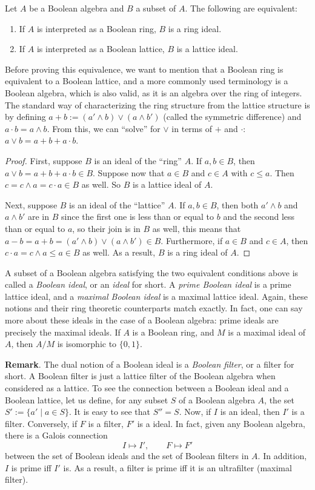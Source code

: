 \documentclass[12pt]{article}
\begin{document}
Let $A$ be a Boolean algebra and $B$ a subset of $A$.  The following are equivalent:
\begin{enumerate}
\item If $A$ is interpreted as a Boolean ring, $B$ is a ring ideal.
\item If $A$ is interpreted as a Boolean lattice, $B$ is a lattice ideal.
\end{enumerate}
Before proving this equivalence, we want to mention that a Boolean ring is equivalent to a Boolean lattice, and a more commonly used terminology is a Boolean algebra, which is also valid, as it is an algebra over the ring of integers.  The standard way of characterizing the ring structure from the lattice structure is by defining $a+b:=(a'\wedge b)\vee (a\wedge b')$ (called the symmetric difference) and $a\cdot b=a\wedge b$.  From this, we can ``solve'' for $\vee $ in terms of $+$ and $\cdot$: $a\vee b=a+b+a\cdot b$.

\begin{proof}
First, suppose $B$ is an ideal of the ``ring'' $A$.  If $a,b\in B$, then $a\vee b= a+b+a\cdot b\in B$.  Suppose now that $a\in B$ and $c\in A$ with $c\le a$.  Then $c=c\wedge a=c\cdot a \in B$ as well.  So $B$ is a lattice ideal of $A$.

Next, suppose $B$ is an ideal of the ``lattice'' $A$.  If $a,b\in B$, then both $a'\wedge b$ and $a\wedge b'$ are in $B$ since the first one is less than or equal to $b$ and the second less than or equal to $a$, so their join is in $B$ as well, this means that $a-b=a+b=(a'\wedge b)\vee (a\wedge b')\in B$.  Furthermore, if $a\in B$ and $c\in A$, then $c\cdot a=c\wedge a\le a\in B$ as well.  As a result, $B$ is a ring ideal of $A$.
\end{proof}

A subset of a Boolean algebra satisfying the two equivalent conditions above is called a \emph{Boolean ideal}, or an \emph{ideal} for short.  A \emph{prime Boolean ideal} is a prime lattice ideal, and a \emph{maximal Boolean ideal} is a maximal lattice ideal.  Again, these notions and their ring theoretic counterparts match exactly.  In fact, one can say more about these ideals in the case of a Boolean algebra: prime ideals are precisely the maximal ideals.  If $A$ is a Boolean ring, and $M$ is a maximal ideal of $A$, then $A/M$ is isomorphic to $\lbrace 0,1\rbrace$.

\textbf{Remark}.  The dual notion of a Boolean ideal is a \emph{Boolean filter}, or a filter for short.  A Boolean filter is just a lattice filter of the Boolean algebra when considered as a lattice.  To see the connection between a Boolean ideal and a Boolean lattice, let us define, for any subset $S$ of a Boolean algebra $A$, the set $S':=\lbrace a'\mid a\in S\rbrace$.  It is easy to see that $S''=S$.  Now, if $I$ is an ideal, then $I'$ is a filter.  Conversely, if $F$ is a filter, $F'$ is a ideal.  In fact, given any Boolean algebra, there is a Galois connection $$I\mapsto I',\qquad F\mapsto F'$$ between the set of Boolean ideals and the set of Boolean filters in $A$.  In addition, $I$ is prime iff $I'$ is.  As a result, a filter is prime iff it is an ultrafilter (maximal filter).
\end{document}
